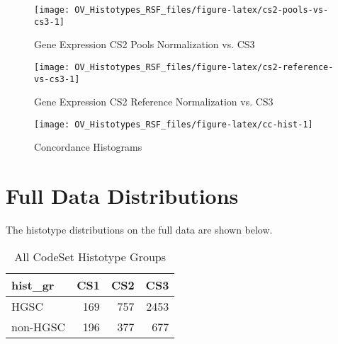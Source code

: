 \documentclass[
]{report}
\begin{document}
\begin{figure}[H]

{\centering \texttt{[image: OV\_Histotypes\_RSF\_files/figure-latex/cs2-pools-vs-cs3-1]} 

}

\caption{Gene Expression CS2 Pools Normalization vs. CS3}\label{fig:cs2-pools-vs-cs3}
\end{figure}

\begin{figure}[H]

{\centering \texttt{[image: OV\_Histotypes\_RSF\_files/figure-latex/cs2-reference-vs-cs3-1]} 

}

\caption{Gene Expression CS2 Reference Normalization vs. CS3}\label{fig:cs2-reference-vs-cs3}
\end{figure}

\begin{figure}[H]

{\centering \texttt{[image: OV\_Histotypes\_RSF\_files/figure-latex/cc-hist-1]} 

}

\caption{Concordance Histograms}\label{fig:cc-hist}
\end{figure}

\hypertarget{full-data-distributions}{%
\section{Full Data Distributions}\label{full-data-distributions}}

The histotype distributions on the full data are shown below.

\begin{table}

\caption{\label{tab:dist-all-gr}All CodeSet Histotype Groups}
\centering
\begin{tabular}[t]{l|r|r|r}
\hline
hist\_gr & CS1 & CS2 & CS3\\
\hline
HGSC & 169 & 757 & 2453\\
\hline
non-HGSC & 196 & 377 & 677\\
\hline
\end{tabular}
\end{table}
\end{document}
